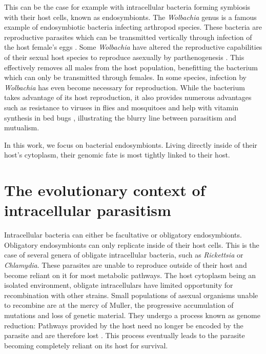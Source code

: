 This can be the case for example with intracellular bacteria forming symbiosis with their host cells, known as endosymbionts. The \textit{Wolbachia} genus is a famous example of endosymbiotic bacteria infecting arthropod species. These bacteria are reproductive parasites which can be transmitted vertically through infection of the host female's eggs \cite{Knight2001}. Some \textit{Wolbachia} have altered the reproductive capabilities of their sexual host species to reproduce asexually by \Gls{parthenogenesis} \cite{Stouthamer1993}. This effectively removes all males from the host population, benefitting the bacterium which can only be transmitted through females. In some species, infection by \textit{Wolbachia} has even become necessary for reproduction. While the bacterium takes advantage of its host reproduction, it also provides numerous advantages such as resistance to viruses in flies and mosquitoes \citep{Hedges2008,Teixeira2008} and help with vitamin synthesis in bed bugs \cite{Nikoh2014}, illustrating the blurry line between parasitism and mutualism.

In this work, we focus on bacterial endosymbionts. Living directly inside of their host's cytoplasm, their genomic fate is most tightly linked to their host.

\section{The evolutionary context of intracellular parasitism}

Intracellular bacteria can either be facultative or obligatory endosymbionts. Obligatory endosymbionts can only replicate inside of their host cells. This is the case of several genera of obligate intracellular bacteria, such as \textit{Rickettsia} or \textit{Chlamydia}. These parasites are unable to reproduce outside of their host and become reliant on it for most metabolic pathways. The host cytoplasm being an isolated environment, obligate intracellulars have limited opportunity for recombination with other strains. Small populations of asexual organisms unable to recombine are at the mercy of \Gls{Muller}, the progressive accumulation of mutations and loss of genetic material. They undergo a process known as genome reduction: Pathways provided by the host need no longer be encoded by the parasite and are therefore lost \cite{McCutcheon2012}. This process eventually leads to the parasite becoming completely reliant on its host for survival.

